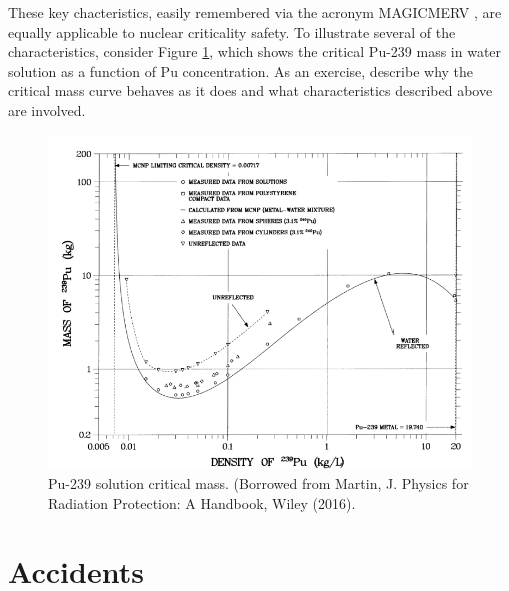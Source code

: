 These key chacteristics, easily remembered via the acronym 
MAGICMERV \cite{pevey2010neu}, are equally applicable to nuclear
criticality safety. To illustrate several of the characteristics, 
consider Figure 
\ref{fig:pu_critical_mass}, which shows the critical Pu-239 mass in
water solution as a function of Pu concentration. As an exercise, 
describe why the critical mass curve behaves as it does and what
characteristics described above are involved.
\begin{figure}[ht] 
    \centering
    \includegraphics[keepaspectratio, width = 5.0 in]{images/pu_critical_mass}
    \caption{Pu-239 solution critical mass. (Borrowed from Martin, J. {
             Physics for Radiation Protection: A Handbook}, Wiley (2016).}
    \label{fig:pu_critical_mass}
\end{figure}


\section*{Accidents}

